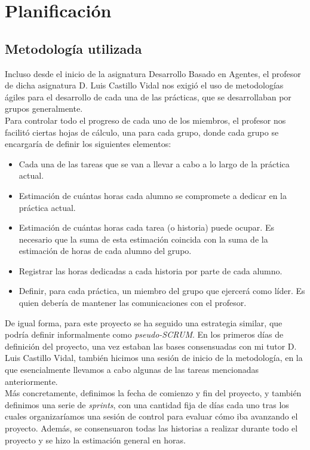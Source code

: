\chapter{Planificación}

\section{Metodología utilizada}

Incluso desde el inicio de la asignatura Desarrollo Basado en Agentes, el profesor de dicha asignatura D. Luis Castillo Vidal nos exigió el uso de metodologías ágiles para el desarrollo de cada una de las prácticas, que se desarrollaban por grupos generalmente.\\

Para controlar todo el progreso de cada uno de los miembros, el profesor nos facilitó ciertas hojas de cálculo, una para cada grupo, donde cada grupo se encargaría de definir los siguientes elementos:

\begin{itemize}
	\item Cada una de las tareas que se van a llevar a cabo a lo largo de la práctica actual.
	\item Estimación de cuántas horas cada alumno se compromete a dedicar en la práctica actual.
	\item Estimación de cuántas horas cada tarea (o historia) puede ocupar. Es necesario que la suma de esta estimación coincida con la suma de la estimación de horas de cada alumno del grupo.
	\item Registrar las horas dedicadas a cada historia por parte de cada alumno.
	\item Definir, para cada práctica, un miembro del grupo que ejercerá como líder. Es quien debería de mantener las comunicaciones con el profesor.
\end{itemize}

De igual forma, para este proyecto se ha seguido una estrategia similar, que podría definir informalmente como \textit{pseudo-SCRUM}. En los primeros días de definición del proyecto, una vez estaban las bases consensuadas con mi tutor D. Luis Castillo Vidal, también hicimos una sesión de inicio de la metodología, en la que esencialmente llevamos a cabo algunas de las tareas mencionadas anteriormente.\\

Más concretamente, definimos la fecha de comienzo y fin del proyecto, y también definimos una serie de \textit{sprints}, con una cantidad fija de días cada uno tras los cuales organizaríamos una sesión de control para evaluar cómo iba avanzando el proyecto. Además, se consensuaron todas las historias a realizar durante todo el proyecto y se hizo la estimación general en horas.

